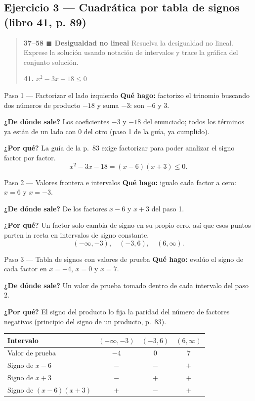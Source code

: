 \documentclass[11pt]{article}
\begin{document}
\subsection*{Ejercicio 3 --- Cuadrática por tabla de signos (libro 41, p. 89)}

\begin{quote}
\textbf{37--58 $\blacksquare$ Desigualdad no lineal} \; Resuelva la desigualdad no lineal. Exprese la solución usando notación de intervalos y trace la gráfica del conjunto solución.

\textbf{41.} $x^2-3x-18\le 0$
\end{quote}

\begin{paso}{Paso 1 --- Factorizar el lado izquierdo}
\textbf{Qué hago:} factorizo el trinomio buscando dos números de producto $-18$ y suma $-3$: son $-6$ y $3$.

\textbf{¿De dónde sale?} Los coeficientes $-3$ y $-18$ del enunciado; todos los términos ya están de un lado con $0$ del otro (paso 1 de la guía, ya cumplido).

\textbf{¿Por qué?} La guía de la p.~83 exige factorizar para poder analizar el signo factor por factor.
\[
x^2-3x-18=(x-6)(x+3)\le 0.
\]
\end{paso}

\begin{paso}{Paso 2 --- Valores frontera e intervalos}
\textbf{Qué hago:} igualo cada factor a cero: $x=6$ y $x=-3$.

\textbf{¿De dónde sale?} De los factores $x-6$ y $x+3$ del paso 1.

\textbf{¿Por qué?} Un factor solo cambia de signo en su propio cero, así que esos puntos parten la recta en intervalos de signo constante.
\[
(-\infty,-3),\quad (-3,6),\quad (6,\infty).
\]
\end{paso}

\begin{paso}{Paso 3 --- Tabla de signos con valores de prueba}
\textbf{Qué hago:} evalúo el signo de cada factor en $x=-4$, $x=0$ y $x=7$.

\textbf{¿De dónde sale?} Un valor de prueba tomado dentro de cada intervalo del paso 2.

\textbf{¿Por qué?} El signo del producto lo fija la paridad del número de factores negativos (principio del signo de un producto, p.~83).

\begin{center}
\begin{tabular}{|l|c|c|c|}
\hline
Intervalo & $(-\infty,-3)$ & $(-3,6)$ & $(6,\infty)$ \\
\hline
Valor de prueba & $-4$ & $0$ & $7$ \\
Signo de $x-6$ & $-$ & $-$ & $+$ \\
Signo de $x+3$ & $-$ & $+$ & $+$ \\
\hline
Signo de $(x-6)(x+3)$ & $+$ & $-$ & $+$ \\
\hline
\end{tabular}
\end{center}
\end{paso}
\end{document}
